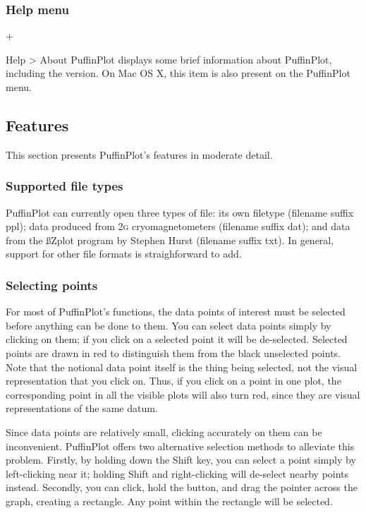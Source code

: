 \documentclass[a4paper]{article}
\newcommand{\menuitemlabel}[1]{%
\mbox{\textsf{#1}}\hfil}
\newenvironment{menuitemlist}%
{\begin{list}{}{%
\renewcommand{\makelabel}{\menuitemlabel}%
\setlength{\labelwidth}{35pt}%
\setlength{\leftmargin}%
             {\labelwidth+\labelsep}}}%
{\end{list}}
\newcommand{\ppcmd}[1]{\textsf{#1}} %
\newcommand{\caps}[1]{\textsc{#1}} %
\newcommand{\submenu}{ \textgreater{} } %
\begin{document}
\subsubsection{Help menu}

\begin{menuitemlist}

\item[Help\submenu About PuffinPlot] displays some brief information
about PuffinPlot, including the version. On Mac OS X, this item is
also present on the \ppcmd{PuffinPlot} menu.

\end{menuitemlist}

\subsection{Features}

This section presents PuffinPlot's features in moderate detail.

\subsubsection{\label{sec:manual-file-types}Supported file types}

PuffinPlot can currently open three types of file: its own filetype (filename
suffix \ppcmd{ppl}); data produced from 2\caps{g} cryomagnetometers (filename
suffix \ppcmd{dat}); and data from the {\ss Zplot} program by Stephen Hurst
(filename suffix \ppcmd{txt}). In general, support for other file formats is
straighforward to add.

\subsubsection{Selecting points}

For most of PuffinPlot's functions, the data points of interest must be
selected before anything can be done to them. You can select data points
simply by clicking on them; if you click on a selected point it will be
de-selected. Selected points are drawn in red to distinguish them from the
black unselected points. Note that the notional data point itself is the
thing being selected, not the visual representation that you click on. Thus,
if you click on a point in one plot, the corresponding point in all the
visible plots will also turn red, since they are visual representations of
the same datum.

Since data points are relatively small, clicking accurately on them can be
inconvenient. PuffinPlot offers two alternative selection methods to
alleviate this problem. Firstly, by holding down the \ppcmd{Shift} key, you
can select a point simply by left-clicking near it; holding \ppcmd{Shift} and
right-clicking will de-select nearby points instead. Secondly, you can click,
hold the button, and drag the pointer across the graph, creating a rectangle.
Any point within the rectangle will be selected.
\end{document}
